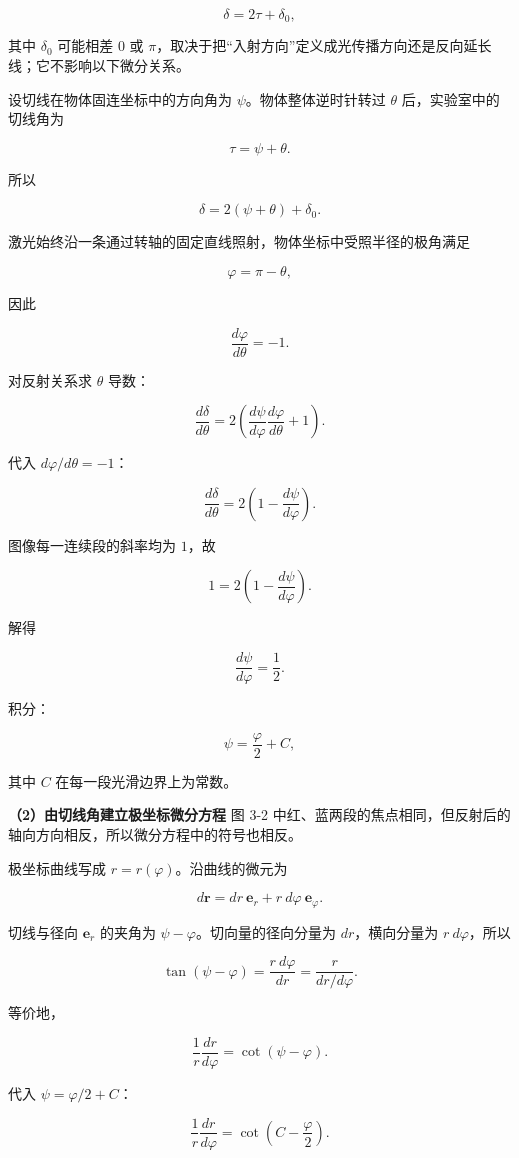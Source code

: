 \documentclass[12pt,a4paper,UTF8]{ctexart}
\begin{document}
\[\delta=2\tau+\delta_0,\]

其中 \(\delta_0\) 可能相差 \(0\) 或
\(\pi\)，取决于把``入射方向''定义成光传播方向还是反向延长线；它不影响以下微分关系。

设切线在物体固连坐标中的方向角为 \(\psi\)。物体整体逆时针转过 \(\theta\)
后，实验室中的切线角为

\[\tau=\psi+\theta.\]

所以

\[\delta=2(\psi+\theta)+\delta_0.\]

激光始终沿一条通过转轴的固定直线照射，物体坐标中受照半径的极角满足

\[\varphi=\pi-\theta,\]

因此

\[\frac{d\varphi}{d\theta}=-1.\]

对反射关系求 \(\theta\) 导数：

\[\frac{d\delta}{d\theta}
=2\left(\frac{d\psi}{d\varphi}\frac{d\varphi}{d\theta}+1\right).\]

代入 \(d\varphi/d\theta=-1\)：

\[\frac{d\delta}{d\theta}=2\left(1-\frac{d\psi}{d\varphi}\right).\]

图像每一连续段的斜率均为 \(1\)，故

\[1=2\left(1-\frac{d\psi}{d\varphi}\right).\]

解得

\[\boxed{\frac{d\psi}{d\varphi}=\frac12}.\]

积分：

\[\boxed{\psi=\frac\varphi2+C},\]

其中 \(C\) 在每一段光滑边界上为常数。

\textbf{（2）由切线角建立极坐标微分方程} 图 3-2
中红、蓝两段的焦点相同，但反射后的轴向方向相反，所以微分方程中的符号也相反。

极坐标曲线写成 \(r=r(\varphi)\)。沿曲线的微元为

\[d\bm r=dr\ \bm e_r+r\ d\varphi\ \bm e_\varphi.\]

切线与径向 \(\bm e_r\) 的夹角为 \(\psi-\varphi\)。切向量的径向分量为
\(dr\)，横向分量为 \(r\ d\varphi\)，所以

\[\tan(\psi-\varphi)=\frac{r\ d\varphi}{dr}=\frac{r}{dr/d\varphi}.\]

等价地，

\[\frac1r\frac{dr}{d\varphi}=\cot(\psi-\varphi).\]

代入 \(\psi=\varphi/2+C\)：

\[\frac1r\frac{dr}{d\varphi}
=\cot\left(C-\frac\varphi2\right).\]
\end{document}
